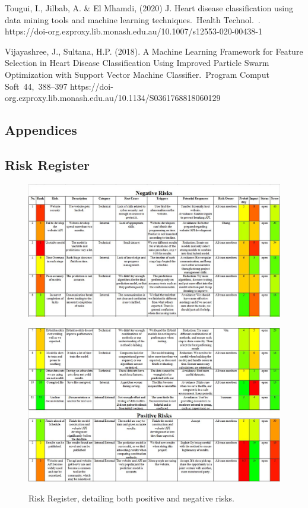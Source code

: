\documentclass[a4paper, 12pt]{article}
\begin{document}
\begin{hangparas}{0.7cm}{1}
Tougui, I., Jilbab, A. & El Mhamdi, (2020) J. Heart disease classification using data mining tools and machine learning techniques. Health Technol. . https://doi-org.ezproxy.lib.monash.edu.au/10.1007/s12553-020-00438-1

Vijayashree, J., Sultana, H.P. (2018).  A Machine Learning Framework for Feature Selection in Heart Disease Classification Using Improved Particle Swarm Optimization with Support Vector Machine Classifier. Program Comput Soft 44, 388–397 https://doi-org.ezproxy.lib.monash.edu.au/10.1134/S0361768818060129
\end{hangparas}
\vfill

\begin{landscape}
\section{Appendices}
\subsection{Risk Register}
\begin{figure}[h!] 
    \centering
    \includegraphics[width=1.5\textwidth]{RiskRegister1.jpg}
\end{figure}
\end{landscape}
\begin{landscape}
\begin{figure}
    \centering
    \includegraphics[width=1.5\textwidth]{RiskRegister2.jpg}
    \label{fig:Risk}
    \caption{Risk Register, detailing both positive and negative risks.}
\end{figure}
\end{landscape}
\end{document}
